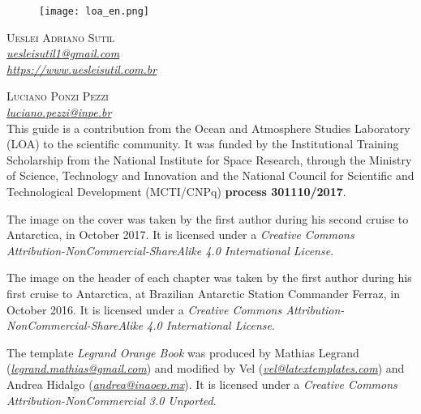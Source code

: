 \newpage
\thispagestyle{empty}

\begin{figure}[H]
    \centering
    \vspace*{\fill}
    \texttt{[image: loa\_en.png]}
    \vspace{0.5cm}
\end{figure}

\noindent\textsc{Ueslei Adriano Sutil} 
\\
 \textcolor{bleu_cite}{\href{mailto:uesleisutil1@gmail.com}{\textit{uesleisutil1@gmail.com}}}
\\  %
 \textcolor{bleu_cite}{\href{https://www.uesleisutil.com.br}{\textit{https://www.uesleisutil.com.br}}}
\bigskip

\noindent\textsc{Luciano Ponzi Pezzi}
\\
 \textcolor{bleu_cite}{\href{mailto:luciano.pezzi@inpe.br}{\textit{luciano.pezzi@inpe.br}}}  %
\bigskip
\\

 This guide is a contribution from the Ocean and Atmosphere Studies Laboratory (LOA)
to the scientific community. It was funded by the Institutional Training Scholarship from the National Institute for Space Research, 
through the Ministry of Science, Technology and Innovation and the National Council for Scientific and Technological Development (MCTI/CNPq) 
\textbf{process 301110/2017}.
\bigskip

 The image on the cover was taken by the first author during his second cruise to Antarctica,
in October 2017. It is licensed under a \textit{Creative Commons Attribution-NonCommercial-ShareAlike 4.0 International License}. 
\bigskip

 The image on the header of each chapter was taken by the first author during his first cruise to Antarctica, at Brazilian Antarctic Station Commander Ferraz, in October 2016. 
It is licensed under a \textit{Creative Commons Attribution-NonCommercial-ShareAlike 4.0 International License}. 
\bigskip

 The template \textit{Legrand Orange Book} was produced by Mathias Legrand (\textcolor{bleu_cite}{\href{mailto:legrand.mathias@gmail.com}{\textit{legrand.mathias@gmail.com}}}) 
and modified by Vel (\textcolor{bleu_cite}{\href{mailto:vel@latextemplates.com}{\textit{vel@latextemplates.com}}}) and Andrea Hidalgo (\textcolor{bleu_cite}{\href{mailto:andrea@inaoep.mx}{\textit{andrea@inaoep.mx}}}). 
It is licensed under a \textit{Creative Commons Attribution-NonCommercial 3.0 Unported}.
\bigskip

